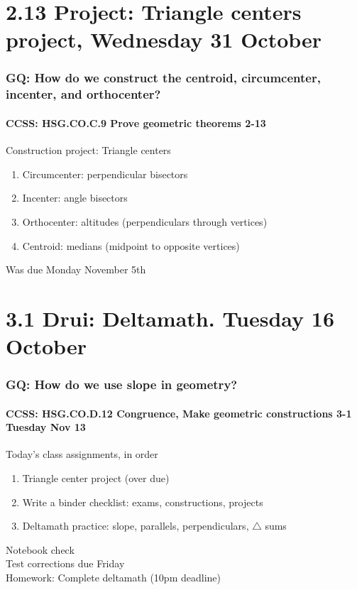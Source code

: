 \documentclass{beamer}
\begin{document}
\section{2.13 Project: Triangle centers project, Wednesday 31 October}
  \frame
  {
    \frametitle{GQ: How do we construct the centroid, circumcenter, incenter, and orthocenter?}
    \framesubtitle{CCSS: HSG.CO.C.9 Prove geometric theorems  \alert{2-13}}

    \begin{block}{Construction project: Triangle centers}
    \begin{enumerate}
        \item Circumcenter: perpendicular bisectors
        \item Incenter: angle bisectors
        \item Orthocenter: altitudes (perpendiculars through vertices)
        \item Centroid: medians (midpoint to opposite vertices)
    \end{enumerate}
    \end{block}
    Was due Monday November 5th
    }

\section{3.1 Drui: Deltamath. Tuesday 16 October}
  \frame
  {
    \frametitle{GQ: How do we use slope in geometry?}
    \framesubtitle{CCSS: HSG.CO.D.12 Congruence, Make geometric constructions  \alert{3-1 Tuesday Nov 13}}

    \begin{block}{Today's class assignments, in order}
    \begin{enumerate}
        \item Triangle center project (over due)
        \item Write a binder checklist: exams, constructions, projects
        \item Deltamath practice: slope, parallels, perpendiculars, $\triangle$ sums
    \end{enumerate}
    \end{block}

    Notebook check \\ \bigskip
    Test corrections due Friday\\ \bigskip
    Homework: Complete deltamath (10pm deadline)
  }
\end{document}
